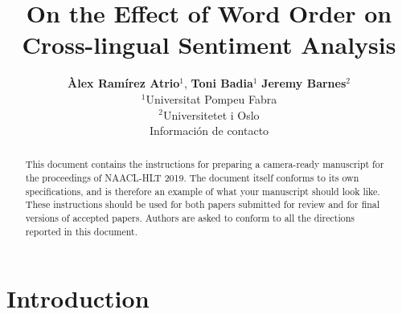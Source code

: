 \documentclass[11pt,a4paper]{article}
\title{On the Effect of Word Order on Cross-lingual Sentiment Analysis}
\author {\textbf{{\`A}lex Ramírez Atrio$^1$}, \textbf{Toni Badia$^{1}$} \textbf{Jeremy Barnes$^{2}$}\\
$^1$Universitat Pompeu Fabra\\
$^2$Universitetet i Oslo\\
Información de contacto\\
}
\date{}
\begin{document}
\maketitle
\begin{abstract}
  This document contains the instructions for preparing a camera-ready
  manuscript for the proceedings of NAACL-HLT 2019. The document itself
  conforms to its own specifications, and is therefore an example of
  what your manuscript should look like. These instructions should be
  used for both papers submitted for review and for final versions of
  accepted papers.  Authors are asked to conform to all the directions
  reported in this document.
\end{abstract}


\section{Introduction}
\end{document}
